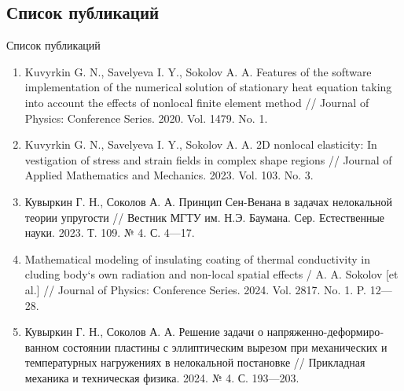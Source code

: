\subsection{Список публикаций}
\begin{frame}{Список публикаций}
	\footnotesize
    \begin{enumerate}
    \justifying
        \item Kuvyrkin G. N., Savelyeva I. Y., Sokolov A. A. Features of the software implementation of the numerical solution of stationary heat equation taking into account the effects of nonlocal finite element method // Journal of Physics: Conference Series. 2020. Vol. 1479. No. 1.

        \item Kuvyrkin G. N., Savelyeva I. Y., Sokolov A. A. 2D nonlocal elasticity: In vestigation of stress and strain fields in complex shape regions // Journal of Applied Mathematics and Mechanics. 2023. Vol. 103. No. 3.

        \item Кувыркин Г. Н., Соколов А. А. Принцип Сен-Венана в задачах нело­кальной теории упругости // Вестник МГТУ им. Н.Э. Баумана. Сер. Естественные науки. 2023. Т. 109. № 4. С. 4—17.

        \item Mathematical modeling of insulating coating of thermal conductivity in cluding body`s own radiation and non-local spatial effects / A. A. Sokolov [et al.] // Journal of Physics: Conference Series. 2024. Vol. 2817. No. 1. P. 12—28.

        \item Кувыркин Г. Н., Соколов А. А. Решение задачи о напряженно-дефо\-рмиро­ванном состоянии пластины с эллиптическим вырезом при механических и температурных нагружениях в нелокальной постановке // Прикладная механика и техническая физика. 2024. № 4. С. 193—203.
	\end{enumerate}
\end{frame}

